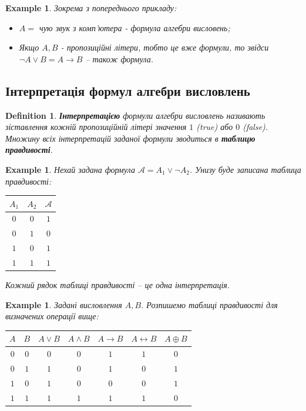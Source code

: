 \documentclass[a4paper, 14pt]{extarticle}
\theoremstyle{theoremdd}
\theoremstyle{theoremdd}
\newtheorem{definition}[theorem]{Definition}
\theoremstyle{theoremdd}
\theoremstyle{theoremdd}
\theoremstyle{theoremdd}
\newtheorem{example}[theorem]{Example}
\theoremstyle{theoremdd}
\theoremstyle{theoremdd}
\theoremstyle{theoremdd}
\theoremstyle{theoremdd}
\theoremstyle{theoremdd}
\theoremstyle{theoremdd}
\theoremstyle{theoremdd}
\theoremstyle{theoremdd}
\theoremstyle{theoremdd}
\theoremstyle{theoremdd}
\begin{document}
\begin{example}
Зокрема з попереднього прикладу:
\begin{itemize}[nosep,wide=0pt,label={-}]
\item $A = $ чую звук з комп'ютера - формула алгебри висловень;
\item Якщо $A,B$ - пропозиційні літери, тобто це вже формули, то звідси $\neg A \vee B = A \rightarrow B$ -- також формула.
\end{itemize}
\end{example}

\subsection{Інтерпретація формул алгебри висловлень}
\begin{definition}
\textbf{Інтерпретацією} формули алгебри висловлень називають зіставлення кожній пропозиційній літері значення $1$ (true) або $0$ (false).\\
Множину всіх інтерпретацій заданої формули зводиться в \textbf{таблицю правдивості}.
\end{definition}

\begin{example}
Нехай задана формула $\mathcal{A} = A_1 \vee \neg A_2$. Унизу буде записана таблица правдивості:
\begin{center}
\begin{tabular}{ |c|c|c| } 
 \hline
 $A_1$ & $A_2$ & $\mathcal{A}$ \\
 \hline
 $0$ & $0$ & $1$ \\ 
 $0$ & $1$ & $0$ \\ 
 $1$ & $0$ & $1$ \\
 $1$ & $1$ & $1$ \\ 
 \hline
\end{tabular}
\end{center}
Кожний рядок таблиці правдивості -- це одна інтерпретація.
\end{example}

\begin{example}
Задані висловлення $A,B$. Розпишемо таблиці правдивості для визначених операції вище:
\begin{center}
\begin{tabular}{ |c|c|c|c|c|c|c| } 
 \hline
 $A$ & $B$ & $A \vee B$ & $A \wedge B$ & $A \rightarrow B$ & $A \leftrightarrow B$ & $A \oplus B$ \\
 \hline
 $0$ & $0$ & $0$ & $0$ & $1$ & $1$ & $0$ \\ 
 $0$ & $1$ & $1$ & $0$ & $1$ & $0$ & $1$ \\ 
 $1$ & $0$ & $1$ & $0$ & $0$ & $0$ & $1$ \\
 $1$ & $1$ & $1$ & $1$ & $1$ & $1$ & $0$ \\ 
 \hline
\end{tabular}
\end{center}
\end{example}
\end{document}

